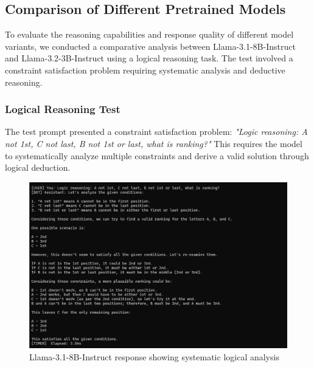 \documentclass[12pt,a4paper]{article}
\begin{document}
\subsection{Comparison of Different Pretrained Models}

To evaluate the reasoning capabilities and response quality of different model variants, we conducted a comparative analysis between Llama-3.1-8B-Instruct and Llama-3.2-3B-Instruct using a logical reasoning task. The test involved a constraint satisfaction problem requiring systematic analysis and deductive reasoning.

\subsubsection{Logical Reasoning Test}

The test prompt presented a constraint satisfaction problem: \textit{"Logic reasoning: A not 1st, C not last, B not 1st or last, what is ranking?"} This requires the model to systematically analyze multiple constraints and derive a valid solution through logical deduction.

\begin{figure}[H]
    \centering
    \includegraphics[width=0.95\linewidth]{Figures/3.1-8B ans.png}
    \caption{Llama-3.1-8B-Instruct response showing systematic logical analysis}
    \label{fig:llama31_reasoning}
\end{figure}
\end{document}
